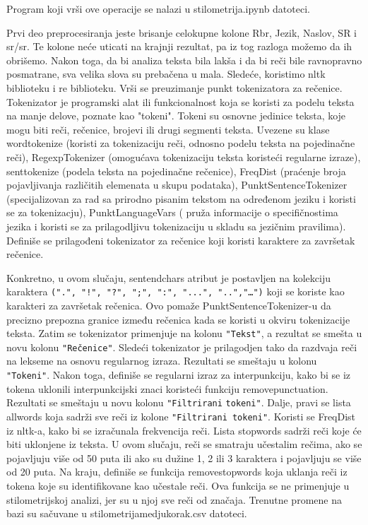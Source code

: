 \documentclass{article}
\begin{document}
\begin{flushleft}
Program koji vrši ove operacije se nalazi u stilometrija.ipynb 
datoteci.\\\vspace{1.5mm}

Prvi deo preprocesiranja jeste brisanje celokupne kolone Rbr, Jezik, Naslov, SR i 
sr/sr. Te kolone neće uticati na krajnji rezultat, pa iz tog razloga možemo da ih
obrišemo.
Nakon toga, da bi analiza teksta bila lakša i da bi reči bile ravnopravno 
posmatrane, sva velika slova su prebačena u mala. Sledeće, koristimo nltk 
biblioteku i re biblioteku. Vrši se preuzimanje punkt tokenizatora za rečenice.
Tokenizator je programski alat ili funkcionalnost koja se koristi za podelu teksta
na manje delove, poznate kao "tokeni". Tokeni su osnovne jedinice teksta, koje mogu
biti reči, rečenice, brojevi ili drugi segmenti teksta. Uvezene su klase 
word\textunderscore tokenize (koristi za tokenizaciju reči, odnosno podelu teksta 
na pojedinačne reči), RegexpTokenizer (omogućava tokenizaciju teksta koristeći 
regularne izraze), sent\textunderscore tokenize (podela teksta na pojedinačne 
rečenice), FreqDist (praćenje broja pojavljivanja različitih elemenata u skupu 
podataka), PunktSentenceTokenizer (specijalizovan za rad sa prirodno pisanim 
tekstom na određenom jeziku i koristi se za tokenizacju), PunktLanguageVars ( pruža 
informacije o specifičnostima jezika i koristi se za prilagodljivu tokenizaciju u 
skladu sa jezičnim pravilima). Definiše se prilagođeni tokenizator za rečenice koji 
koristi karaktere za završetak rečenice.

Konkretno, u ovom slučaju, sent\textunderscore end\textunderscore chars atribut je 
postavljen na kolekciju karaktera \texttt{(".", "!", "?", ";", ":", "...", 
"..","…")} koji se koriste kao karakteri za završetak rečenica. Ovo pomaže 
PunktSentenceTokenizer-u da precizno prepozna granice između rečenica kada se
koristi u okviru tokenizacije teksta. Zatim se tokenizator primenjuje na kolonu 
\verb|"Tekst"|, a rezultat se smešta u novu kolonu \verb|"Rečenice"|. Sledeći 
tokenizator je prilagodjen tako da razdvaja reči na lekseme na osnovu regularnog 
izraza. Rezultati se smeštaju u kolonu \verb|"Tokeni"|. Nakon toga, definiše se 
regularni izraz za interpunkciju, kako bi se iz tokena uklonili interpunkcijski 
znaci koristeći funkciju remove\textunderscore  punctuation. Rezultati se smeštaju 
u novu kolonu \verb|"Filtrirani| \verb|tokeni"|. Dalje, pravi se lista 
all\textunderscore words koja sadrži sve reči iz kolone \verb|"Filtrirani tokeni"|.
Koristi se FreqDist iz nltk-a, kako bi se izračunala frekvencija reči. Lista 
stopwords sadrži reči koje će biti uklonjene iz teksta. U ovom slučaju, reči se 
smatraju učestalim rečima, ako se pojavljuju više od 50 puta ili ako su dužine 1, 2
ili 3 karaktera i pojavljuju se više od 20 puta. Na kraju, definiše se funkcija 
remove\textunderscore stopwords koja uklanja reči iz tokena koje su identifikovane kao učestale reči. Ova funkcija se ne primenjuje u stilometrijskoj analizi, jer su u njoj sve reči od značaja.
Trenutne promene na bazi su sačuvane u stilometrija\textunderscore medjukorak.csv datoteci.


\end{flushleft}
\end{document}
